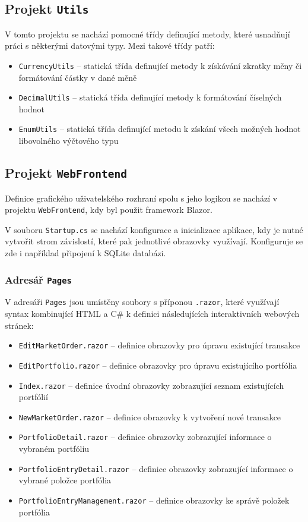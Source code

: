 \documentclass[12pt, a4paper]{article}
\begin{document}
    \subsection{Projekt \texttt{Utils}}
    V tomto projektu se nachází pomocné třídy definující metody, které usnadňují práci s některými datovými typy. 
    Mezi takové třídy patří:

    \begin{itemize}
        \item \texttt{CurrencyUtils} -- statická třída definující metody k získávání zkratky měny či formátování částky v dané měně
        \item \texttt{DecimalUtils} -- statická třída definující metody k formátování číselných hodnot
        \item \texttt{EnumUtils} -- statická třída definující metodu k získání všech možných hodnot libovolného výčtového typu
    \end{itemize}
    
    \subsection{Projekt \texttt{WebFrontend}}
    Definice grafického uživatelského rozhraní spolu s jeho logikou se nachází v projektu \texttt{WebFrontend}, kdy byl
    použit framework Blazor.
    
    V souboru \texttt{Startup.cs} se nachází konfigurace a inicializace aplikace, kdy je nutné vytvořit strom závislostí,
    které pak jednotlivé obrazovky využívají. Konfiguruje se zde i například připojení k SQLite databázi.
    
    \subsubsection{Adresář \texttt{Pages}} 
    V adresáři \texttt{Pages} jsou umístěny soubory s příponou \texttt{.razor}, které využívají syntax kombinující HTML
    a C\# k definici následujících interaktivních webových stránek:
    
    \begin{itemize}
        \item \texttt{EditMarketOrder.razor} -- definice obrazovky pro úpravu existující transakce
        \item \texttt{EditPortfolio.razor} -- definice obrazovky pro úpravu existujícího portfólia
        \item \texttt{Index.razor} -- definice úvodní obrazovky zobrazující seznam existujících portfólií
        \item \texttt{NewMarketOrder.razor} -- definice obrazovky k vytvoření nové transakce
        \item \texttt{PortfolioDetail.razor} -- definice obrazovky zobrazující informace o vybraném portfóliu
        \item \texttt{PortfolioEntryDetail.razor} -- definice obrazovky zobrazující informace o vybrané položce portfólia
        \item \texttt{PortfolioEntryManagement.razor} -- definice obrazovky ke správě položek portfólia
    \end{itemize}
   
\end{document}
